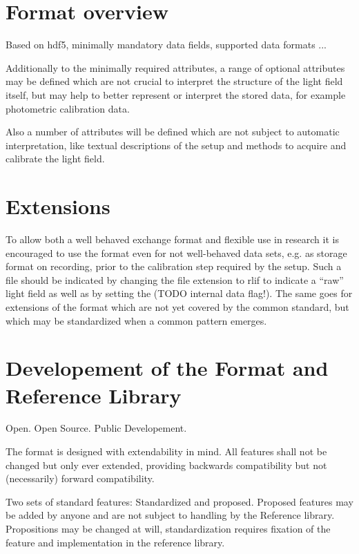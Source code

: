 \documentclass[a4paper,10pt]{article}
\begin{document}
\section{Format overview}

Based on hdf5, minimally mandatory data fields, supported data formats ...

Additionally to the minimally required attributes, a range of optional attributes may be defined which are not crucial to interpret the structure of the light field itself, but may help to better represent or interpret the stored data, for example photometric calibration data.

Also a number of attributes will be defined which are not subject to automatic interpretation, like textual descriptions of the setup and methods to acquire and calibrate the light field.

\section{Extensions}

To allow both a well behaved exchange format and flexible use in research it is encouraged to use the format even for not well-behaved data sets, e.g. as storage format on recording, prior to the calibration step required by the setup. Such a file should be indicated by changing the file extension to rlif to indicate a ``raw'' light field as well as by setting the (TODO internal data flag!). The same goes for extensions of the format which are not yet covered by the common standard, but which may be standardized when a common pattern emerges. 

\section{Developement of the Format and Reference Library}

Open. Open Source. Public Developement.

The format is designed with extendability in mind. All features shall not be changed but only ever extended, providing backwards compatibility but not (necessarily) forward compatibility.

Two sets of standard features: Standardized and proposed. Proposed features may be added by anyone and are not subject to handling by the Reference library. Propositions may be changed at will, standardization requires fixation of the feature and implementation in the reference library.
\end{document}
